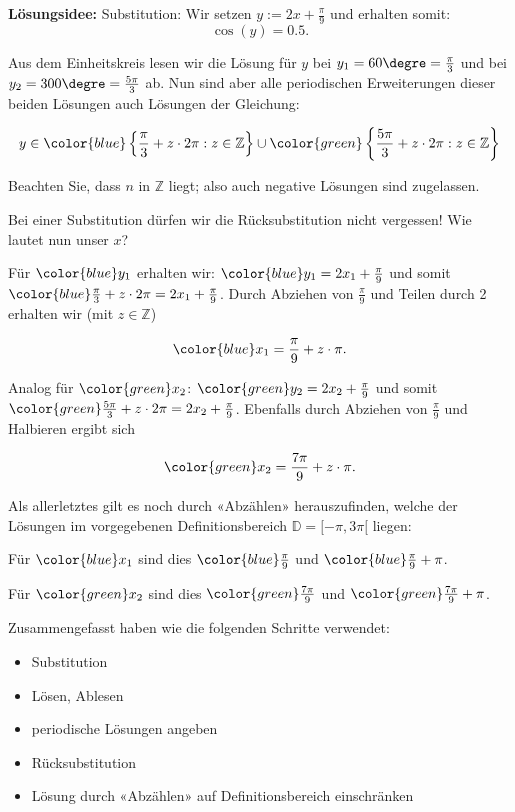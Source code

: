 \textbf{Lösungsidee:} Substitution:
Wir setzen $y := 2x + \frac{\pi}{9}$ und erhalten somit:
$$\cos(y) = 0.5.$$

Aus dem Einheitskreis lesen wir die Lösung für $y$ bei $y_1=60\degre = \frac{\pi}{3}$ und bei $y_2=300\degre = \frac{5\pi}{3}$ ab. Nun sind aber alle periodischen Erweiterungen dieser beiden Lösungen auch Lösungen der Gleichung:

$$y \in {\color{blue}\left\{\frac{\pi}{3} + z\cdot{}2\pi: z\in\mathbb{Z}\right\}} \cup {\color{green}\left\{\frac{5\pi}{3}+ z\cdot{}2\pi: z\in\mathbb{Z}\right\}}$$

Beachten Sie, dass $n$ in $\mathbb{Z}$ liegt; also auch negative Lösungen sind zugelassen.

Bei einer Substitution dürfen wir die Rücksubstitution nicht vergessen! Wie lautet nun unser $x$?

Für ${\color{blue}y_1}$ erhalten wir: ${\color{blue}y_1= 2x_1 + \frac{\pi}{9}}$ und somit ${\color{blue}\frac{\pi}{3} + z\cdot{}2\pi = 2x_1 + \frac{\pi}{9}}$. Durch Abziehen von $\frac{\pi}{9}$ und Teilen durch 2 erhalten wir (mit $z\in\mathbb{Z}$)

$${\color{blue}x_1 = \frac{\pi}{9} + z\cdot{}\pi}.$$

Analog für ${\color{green}x_2}$: ${\color{green}y_2 = 2x_2 + \frac{\pi}{9}}$ und somit ${\color{green}\frac{5\pi}{3} + z\cdot{}2\pi = 2x_2 + \frac{\pi}{9}}$. Ebenfalls durch Abziehen von $\frac{\pi}{9}$ und Halbieren ergibt sich

$${\color{green}x_2 = \frac{7\pi}{9} + z\cdot{}\pi.}$$

Als allerletztes gilt es noch durch «Abzählen» herauszufinden, welche der Lösungen im vorgegebenen Definitionsbereich $\mathbb{D} = [-\pi, 3\pi[$ liegen:

    Für ${\color{blue}x_1}$ sind dies ${\color{blue}\frac{\pi}{9}}$ und ${\color{blue}\frac{\pi}{9} + \pi}$.

    Für ${\color{green}x_2}$ sind dies ${\color{green}\frac{7\pi}{9}}$ und ${\color{green}\frac{7\pi}{9} + \pi}$.
   
    Zusammengefasst haben wie die folgenden Schritte verwendet:
    \begin{rezept}{}{}
\begin{itemize}
    \item Substitution
    \item Lösen, Ablesen
    \item periodische Lösungen angeben
    \item Rücksubstitution
    \item Lösung durch «Abzählen» auf Definitionsbereich einschränken
\end{itemize}
\end{rezept}%
\newpage



